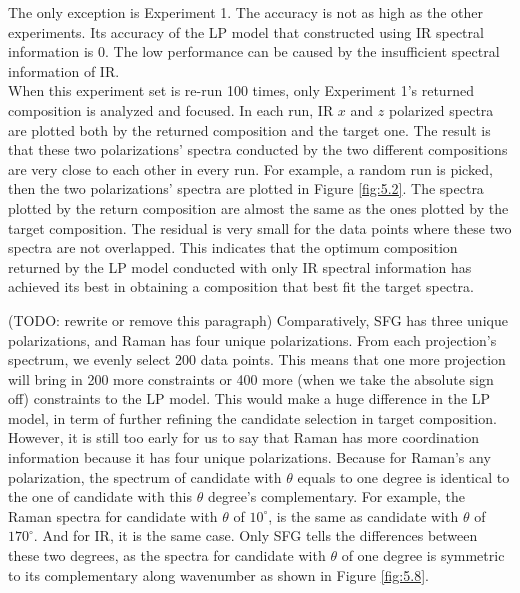 The only exception is Experiment 1. The accuracy is not as high as the other experiments. Its accuracy of the LP model that constructed using IR spectral information is $0$. The low performance can be caused by the insufficient spectral information of IR. \\

When this experiment set is re-run 100 times, only Experiment 1's returned composition is analyzed and focused. In each run, IR $x$ and $z$ polarized spectra are plotted both by the returned composition and the target one. The result is that these two polarizations' spectra conducted by the two different compositions are very close to each other in every run. For example, a random run is picked, then the two polarizations' spectra are plotted in Figure \ref{fig:5.2}. The spectra plotted by the return composition are almost the same as the ones plotted by the target composition. The residual is very small for the data points where these two spectra are not overlapped. This indicates that the optimum composition returned by the LP model conducted with only IR spectral information has achieved its best in obtaining a composition that best fit the target spectra. 

(TODO: rewrite or remove this paragraph) Comparatively, SFG has three unique polarizations, and Raman has four unique polarizations. From each projection's spectrum, we evenly select 200 data points. This means that one more projection will bring in 200 more constraints or 400 more (when we take the absolute sign off) constraints to the LP model. This would make a huge difference in the LP model, in term of further refining the candidate selection in target composition. However, it is still too early for us to say that Raman has more coordination information because it has four unique polarizations. Because for Raman's any polarization, the spectrum of candidate with $\theta$ equals to one degree is identical to the one of candidate with this $\theta$ degree's complementary. For example, the Raman spectra for candidate with $\theta$ of $10^{\circ}$, is the same as candidate with $\theta$ of $170^{\circ}$. And for IR, it is the same case. Only SFG tells the differences between these two degrees, as the spectra for candidate with $\theta$ of one degree is symmetric to its complementary along wavenumber as shown in Figure \ref{fig:5.8}. \\

